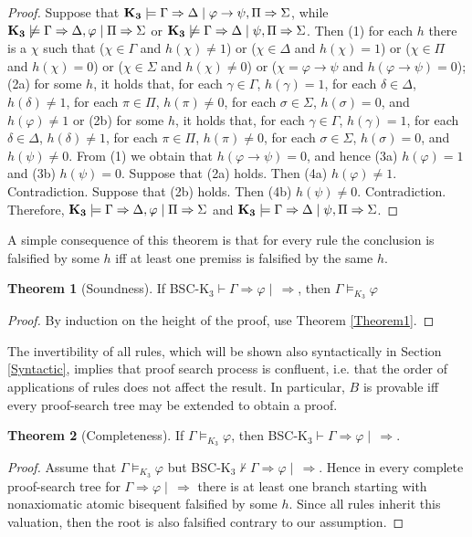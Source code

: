 \documentclass[10pt,a4paper]{article}
\theoremstyle{definition}
\newtheorem{theorem}{\textbf{Theorem}}
\newcommand{\3}{\vspace{.3in}}
\newcommand{\2}{\vspace{.2in}}
\newcommand{\1}{\vspace{.1in}}
\newcommand{\5}{\vspace{.05in}}
\begin{document}
\begin{proof}
Suppose that ${\bf K_3}\models\Gamma\Rightarrow\Delta \mid \varphi\rightarrow\psi,\Pi\Rightarrow\Sigma$, while ${\bf K_3}\not\models\Gamma\Rightarrow\Delta,\varphi \mid \Pi\Rightarrow\Sigma$ or ${\bf K_3}\not\models\Gamma\Rightarrow\Delta \mid \psi,\Pi\Rightarrow\Sigma$. Then (1) for each $ h $ there is a $ \chi $ such that ($ \chi\in\Gamma $ and $ h(\chi)\not=1 $) or ($ \chi\in\Delta $ and $ h(\chi)=1 $) or ($ \chi\in\Pi $ and $ h(\chi)=0$) or ($ \chi\in\Sigma $ and $ h(\chi)\not=0 $) or ($ \chi=\varphi\rightarrow\psi $ and $ h(\varphi\rightarrow\psi)=0 $); (2a) for some $ h $, it holds that, for each $ \gamma\in\Gamma $, $h(\gamma)=1$, for each $ \delta\in\Delta $, $ h(\delta)\not=1 $, for each $ \pi\in\Pi $, $ h(\pi)\not=0 $, for each $ \sigma\in\Sigma $, $ h(\sigma)=0 $, and $ h(\varphi)\not=1 $ or (2b) for some $ h $, it holds that, for each $ \gamma\in\Gamma $, $h(\gamma)=1$, for each $ \delta\in\Delta $, $ h(\delta)\not=1 $, for each $ \pi\in\Pi $, $ h(\pi)\not=0 $, for each $ \sigma\in\Sigma $, $ h(\sigma)=0 $, and $ h(\psi)\not=0 $. From (1) we obtain that $ h(\varphi\rightarrow\psi)=0 $, and hence (3a) $ h(\varphi)=1 $ and (3b) $ h(\psi)=0 $. Suppose that (2a) holds. Then (4a) $ h(\varphi)\not=1 $. Contradiction. Suppose that (2b) holds. Then (4b) $ h(\psi)\not=0 $. Contradiction. Therefore, ${\bf K_3}\models\Gamma\Rightarrow\Delta,\varphi \mid \Pi\Rightarrow\Sigma$ and ${\bf K_3}\models\Gamma\Rightarrow\Delta \mid \psi,\Pi\Rightarrow\Sigma$.
\end{proof}


A simple consequence of this theorem is that for every rule the conclusion is falsified by some $h$ iff at least one premiss is falsified by the same $h$.

\begin{theorem}[Soundness]
	If BSC-K$_3 \vdash \Gamma\Rightarrow\varphi\mid\,\Rightarrow$, then $\Gamma\models_{K_3}\varphi$
\end{theorem}
\begin{proof}
By induction on the height of the proof, use Theorem \ref{Theorem1}.
\end{proof}

The invertibility of all rules, which will be shown also syntactically in Section \ref{Syntactic}, implies that proof search process is confluent, i.e. that the order of applications of rules does not affect the result. In particular, $B$ is provable iff every proof-search tree may be extended to obtain a proof.


\begin{theorem}[Completeness]
	If $\Gamma\models_{K_3}\varphi$, then
	BSC-K$_3 \vdash \Gamma\Rightarrow\varphi\mid\,\Rightarrow$.
\end{theorem}
\begin{proof}
	Assume that $\Gamma\models_{K_3}\varphi$ but BSC-K$_3 \nvdash \Gamma\Rightarrow\varphi \mid\,\Rightarrow$. Hence in every complete proof-search tree for $\Gamma\Rightarrow\varphi \mid\,\Rightarrow$ there is at least one branch starting with nonaxiomatic atomic bisequent falsified by some $h$. Since all rules inherit this valuation, then the root is also falsified contrary to our assumption.
\end{proof}
\end{document}
